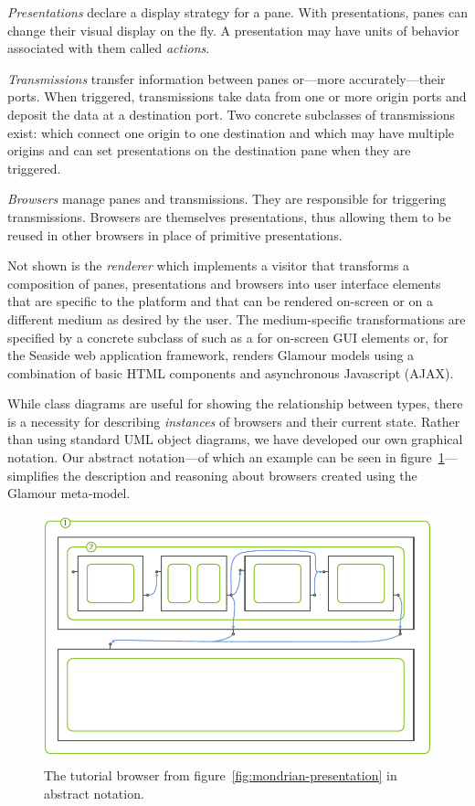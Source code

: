 \documentclass[a4paper,10pt,twoside]{book}
\begin{document}
\emph{Presentations} declare a display strategy for a pane. With
presentations, panes can change their visual display on the fly. A
presentation may have units of behavior associated with them called
\emph{actions}.

\emph{Transmissions} transfer information between panes or---more accurately---their ports. When triggered, transmissions take data from one or more origin ports and deposit the data at a destination port. Two concrete subclasses of transmissions exist:  which connect one origin to one destination and  which may have multiple origins and can set presentations on the destination pane when they are triggered.

\emph{Browsers} manage panes and transmissions. They are responsible for triggering transmissions. Browsers are themselves presentations, thus allowing them to be reused in other browsers in place of primitive presentations.

Not shown is the \emph{renderer} which implements a visitor that
transforms a composition of panes, presentations and browsers into
user interface elements that are specific to the platform and that can
be rendered on-screen or on a different medium as desired by the
user. The medium-specific transformations are specified by a concrete
subclass of  such as a  for
on-screen GUI elements or, for the Seaside web application framework,
 renders Glamour models using a combination of basic
HTML components and asynchronous Javascript (AJAX).

While class diagrams are useful for showing the relationship between
types, there is a necessity for describing \emph{instances} of
browsers and their current state. Rather than using standard UML
object diagrams, we have developed our own graphical notation. Our
abstract notation---of which an example can be seen in
figure~\ref{fig:schematic-browser}---simplifies the description and
reasoning about browsers created using the Glamour meta-model.

\begin{figure}[htbp]
\centerline{\includegraphics[width=\linewidth]{schematic_browser.pdf}}
\caption{The tutorial browser from figure~\ref{fig:mondrian-presentation} in abstract notation.}
\label{fig:schematic-browser}
\end{figure}
\end{document}
